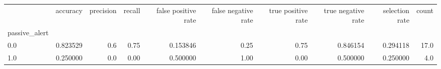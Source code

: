 \begin{tabular}{lrrrrrrrrr}
\toprule
{} &  accuracy &  precision &  recall &  false positive rate &  false negative rate &  true positive rate &  true negative rate &  selection rate &  count \\
passive\_alert &           &            &         &                      &                      &                     &                     &                 &        \\
\midrule
0.0           &  0.823529 &        0.6 &    0.75 &             0.153846 &                 0.25 &                0.75 &            0.846154 &        0.294118 &   17.0 \\
1.0           &  0.250000 &        0.0 &    0.00 &             0.500000 &                 1.00 &                0.00 &            0.500000 &        0.250000 &    4.0 \\
\bottomrule
\end{tabular}
